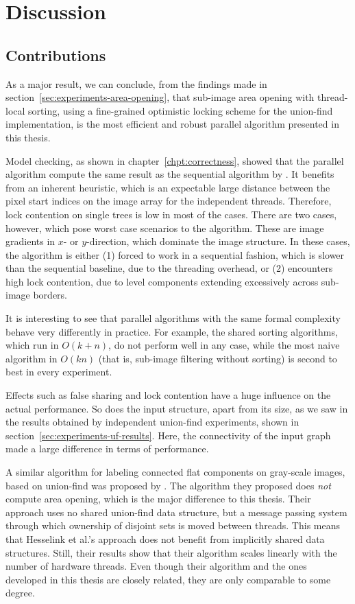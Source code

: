 \chapter{Discussion}
\label{chpt:discussion}

\section{Contributions}
\label{sec:discussion-contribution}

As a major result, we can conclude, from the findings made in
section~\ref{sec:experiments-area-opening}, that sub-image area opening with
thread-local sorting, using a fine-grained optimistic locking scheme for the
union-find implementation, is the most efficient and robust parallel algorithm
presented in this thesis.

Model checking, as shown in chapter~\ref{chpt:correctness}, showed that the
parallel algorithm compute the same result as the sequential algorithm by
\citet{Meijster2002Comparison}. It benefits from an inherent heuristic, which is
an expectable large distance between the pixel start indices on the image array
for the independent threads. Therefore, lock contention on single trees is low
in most of the cases. There are two cases, however, which pose worst case
scenarios to the algorithm. These are image gradients in $x$- or $y$-direction,
which dominate the image structure. In these cases, the algorithm is either (1)
forced to work in a sequential fashion, which is slower than the sequential
baseline, due to the threading overhead, or (2) encounters high lock contention,
due to level components extending excessively across sub-image borders.

It is interesting to see that parallel algorithms with the same formal
complexity behave very differently in practice. For example, the shared sorting
algorithms, which run in $O(k + n)$, do not perform well in any case, while the
most naive algorithm in $O(kn)$ (that is, sub-image filtering without sorting)
is second to best in every experiment.

Effects such as false sharing \cite{Bolosky1993False} and lock contention have a
huge influence on the actual performance. So does the input structure, apart
from its size, as we saw in the results obtained by independent union-find
experiments, shown in section~\ref{sec:experiments-uf-results}. Here, the
connectivity of the input graph made a large difference in terms of performance.

A similar algorithm for labeling connected flat components on gray-scale images,
based on union-find was proposed by \citet{Hesselink2001Concurrent}. The
algorithm they proposed does \emph{not} compute area opening, which is the major
difference to this thesis. Their approach uses no shared union-find data
structure, but a message passing system through which ownership of disjoint sets
is moved between threads. This means that Hesselink et al.'s approach does not
benefit from implicitly shared data structures. Still, their results show that
their algorithm scales linearly with the number of hardware threads. Even though
their algorithm and the ones developed in this thesis are closely related, they
are only comparable to some degree.

